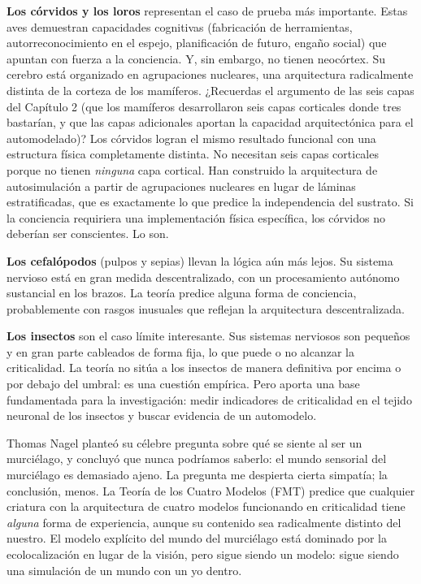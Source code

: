 \documentclass[11pt, twoside, openright]{book}
\begin{document}
\textbf{Los córvidos y los loros} representan el caso de prueba más importante. Estas aves demuestran capacidades cognitivas (fabricación de herramientas, autorreconocimiento en el espejo, planificación de futuro, engaño social) que apuntan con fuerza a la conciencia. Y, sin embargo, no tienen neocórtex. Su cerebro está organizado en agrupaciones nucleares, una arquitectura radicalmente distinta de la corteza de los mamíferos. ¿Recuerdas el argumento de las seis capas del Capítulo 2 (que los mamíferos desarrollaron seis capas corticales donde tres bastarían, y que las capas adicionales aportan la capacidad arquitectónica para el automodelado)? Los córvidos logran el mismo resultado funcional con una estructura física completamente distinta. No necesitan seis capas corticales porque no tienen \textit{ninguna} capa cortical. Han construido la arquitectura de autosimulación a partir de agrupaciones nucleares en lugar de láminas estratificadas, que es exactamente lo que predice la independencia del sustrato. Si la conciencia requiriera una implementación física específica, los córvidos no deberían ser conscientes. Lo son.

\textbf{Los cefalópodos} (pulpos y sepias) llevan la lógica aún más lejos. Su sistema nervioso está en gran medida descentralizado, con un procesamiento autónomo sustancial en los brazos. La teoría predice alguna forma de conciencia, probablemente con rasgos inusuales que reflejan la arquitectura descentralizada.

\textbf{Los insectos} son el caso límite interesante. Sus sistemas nerviosos son pequeños y en gran parte cableados de forma fija, lo que puede o no alcanzar la criticalidad. La teoría no sitúa a los insectos de manera definitiva por encima o por debajo del umbral: es una cuestión empírica. Pero aporta una base fundamentada para la investigación: medir indicadores de criticalidad en el tejido neuronal de los insectos y buscar evidencia de un automodelo.

Thomas Nagel planteó su célebre pregunta sobre qué se siente al ser un murciélago, y concluyó que nunca podríamos saberlo: el mundo sensorial del murciélago es demasiado ajeno. La pregunta me despierta cierta simpatía; la conclusión, menos. La Teoría de los Cuatro Modelos (FMT) predice que cualquier criatura con la arquitectura de cuatro modelos funcionando en criticalidad tiene \textit{alguna} forma de experiencia, aunque su contenido sea radicalmente distinto del nuestro. El modelo explícito del mundo del murciélago está dominado por la ecolocalización en lugar de la visión, pero sigue siendo un modelo: sigue siendo una simulación de un mundo con un yo dentro.
\end{document}
